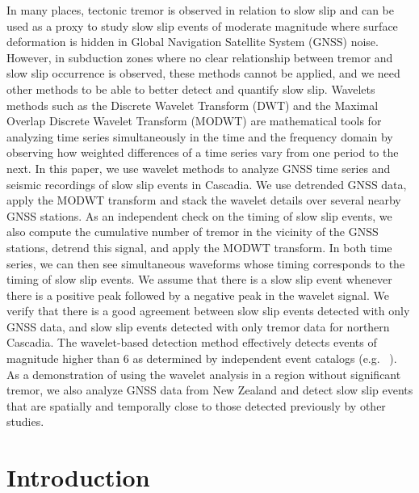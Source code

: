 \documentclass{article}
\begin{document}
In many places, tectonic tremor is observed in relation to slow slip and can be used as a proxy to study slow slip events of moderate magnitude where surface deformation is hidden in Global Navigation Satellite System (GNSS) noise. However, in subduction zones where no clear relationship between tremor and slow slip occurrence is observed, these methods cannot be applied, and we need other methods to be able to better detect and quantify slow slip. Wavelets methods such as the Discrete Wavelet Transform (DWT) and the Maximal Overlap Discrete Wavelet Transform (MODWT) are mathematical tools for analyzing time series simultaneously in the time and the frequency domain by observing how weighted differences of a time series vary from one period to the next. In this paper, we use wavelet methods to analyze GNSS time series and seismic recordings of slow slip events in Cascadia. We use detrended GNSS data, apply the MODWT transform and stack the wavelet details over several nearby GNSS stations. As an independent check on the timing of slow slip events, we also compute the cumulative number of tremor in the vicinity of the GNSS stations, detrend this signal, and apply the MODWT transform. In both time series, we can then see simultaneous waveforms whose timing corresponds to the timing of slow slip events. We assume that there is a slow slip event whenever there is a positive peak followed by a negative peak in the wavelet signal. We verify that there is a good agreement between slow slip events detected with only GNSS data, and slow slip events detected with only tremor data for northern Cascadia. The wavelet-based detection method effectively detects events of magnitude higher than 6 as determined by independent event catalogs (e.g. ~\citep{MIC_2019}). As a demonstration of using the wavelet analysis in a region without significant tremor, we also analyze GNSS data from New Zealand and detect slow slip events that are spatially and temporally close to those detected previously by other studies.

\section{Introduction}
\end{document}
